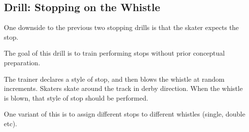 \subsection*{Drill: Stopping on the Whistle}

One downside to the previous two stopping drills is that the skater expects the stop. 

The goal of this drill is to train performing stops without prior conceptual preparation.   

The trainer declares a style of stop, and then blows the whistle at random increments.  
Skaters skate around the track in derby direction.
When the whistle is blown, that style of stop should be performed.

One variant of this is to assign different stops to different whistles (single, double etc).

